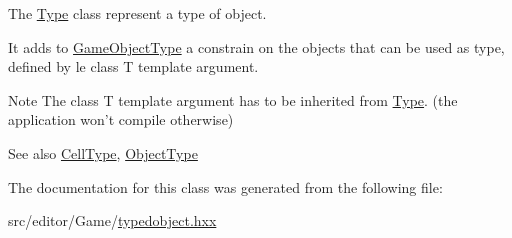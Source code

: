 \-The \hyperlink{class_type}{\-Type} class represent a type of object. 

\-It adds to \hyperlink{class_game_object_type}{\-Game\-Object\-Type} a constrain on the objects that can be used as type, defined by le {\ttfamily class} {\ttfamily \-T} template argument.

\begin{DoxyNote}{\-Note}
\-The {\ttfamily class} {\ttfamily \-T} template argument has to be inherited from \hyperlink{class_type}{\-Type}. (the application won't compile otherwise)
\end{DoxyNote}
\begin{DoxySeeAlso}{\-See also}
\hyperlink{class_cell_type}{\-Cell\-Type}, \hyperlink{class_object_type}{\-Object\-Type} 
\end{DoxySeeAlso}


\-The documentation for this class was generated from the following file\-:\begin{DoxyCompactItemize}
\item 
src/editor/\-Game/\hyperlink{typedobject_8hxx}{typedobject.\-hxx}\end{DoxyCompactItemize}
